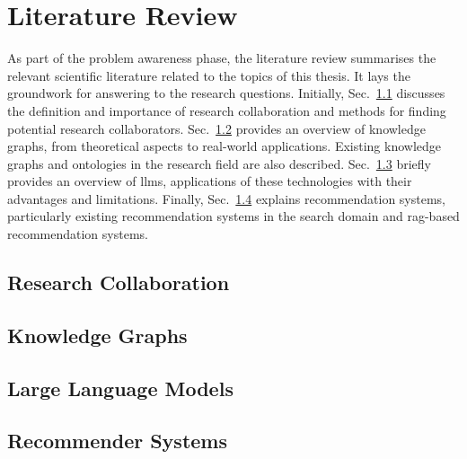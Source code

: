 \chapter{Literature Review}\label{chap:literature-review}

As part of the problem awareness phase, the literature review summarises the relevant scientific literature related to the topics of this thesis.
It lays the groundwork for answering to the research questions.
Initially, Sec.~\ref{sec:research-collaboration} discusses the definition and importance of research collaboration and methods for finding potential research collaborators.
Sec.~\ref{sec:knowledge-graphs} provides an overview of knowledge graphs, from theoretical aspects to real-world applications.
Existing knowledge graphs and ontologies in the research field are also described.
Sec.~\ref{sec:large-language-models} briefly provides an overview of \glspl{llm}, applications of these technologies with their advantages and limitations.
Finally, Sec.~\ref{sec:recommender-systems} explains recommendation systems, particularly existing recommendation systems in the search domain and \gls{rag}-based recommendation systems.
%
\section{Research Collaboration}\label{sec:research-collaboration}

%
\section{Knowledge Graphs}\label{sec:knowledge-graphs}

%
\section{Large Language Models}\label{sec:large-language-models}

%
\section{Recommender Systems}\label{sec:recommender-systems}
